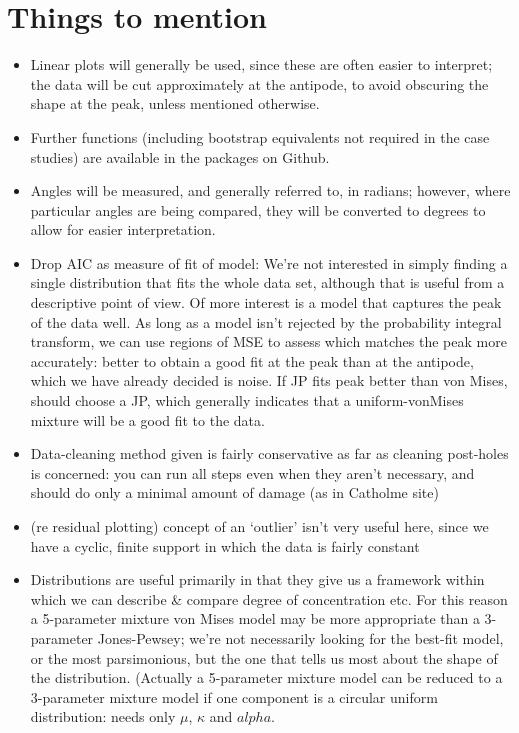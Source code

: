 \documentclass[12pt,fleqn]{article}
\numberwithin{equation}{section}
\begin{document}
\section*{Things to mention}
\begin{itemize}

\item
Linear plots will generally be used, since these are often easier to interpret; the data will be cut approximately at the antipode, to avoid obscuring the shape at the peak, unless mentioned otherwise.
\item
Further functions (including bootstrap equivalents not required in the case studies) are available in the packages on Github.

\item
Angles will be measured, and generally referred to, in radians; however, where particular angles are being compared, they will be converted to degrees to allow for easier interpretation.

\item
Drop AIC as measure of fit of model: We're not interested in simply finding a single distribution that fits the whole data set, although that is useful from a descriptive point of view. Of more interest is a model that captures the peak of the data well. As long as a model isn't rejected by the probability integral transform, we can use regions of MSE to assess which matches the peak more accurately: better to obtain a good fit at the peak than at the antipode, which we have already decided is noise. If JP fits peak better than von Mises, should choose a JP, which generally indicates that a uniform-vonMises mixture will be a good fit to the data.


\item
Data-cleaning method given is fairly conservative as far as cleaning post-holes is concerned: you can run all steps even when they aren't necessary, and should do only a minimal amount of damage (as in Catholme site)

\item
(re residual plotting) concept of an `outlier' isn't very useful here, since we have a cyclic, finite support in which the data is fairly constant
 
\item
Distributions are useful primarily in that they give us a framework within which we can  describe \& compare degree of concentration etc. For this reason a 5-parameter mixture von Mises model may be more appropriate than a 3-parameter Jones-Pewsey; we're not necessarily looking for the best-fit model, or the most parsimonious, but the one that tells us most about the shape of the distribution. (Actually a 5-parameter mixture model can be reduced to a 3-parameter mixture model if one component is a circular uniform distribution: needs only $\mu$, $\kappa$ and $alpha$.


\end{itemize}
\end{document}
